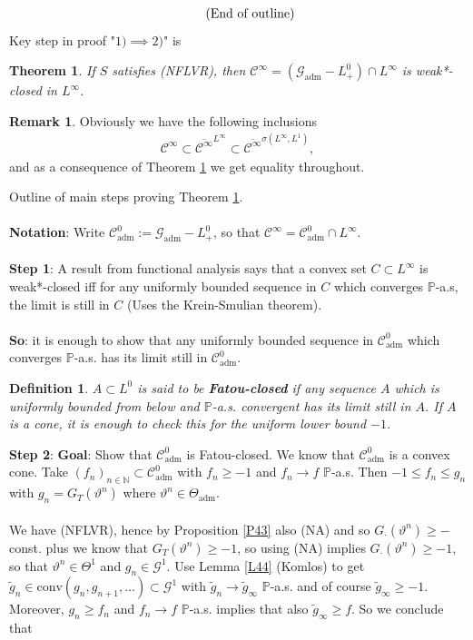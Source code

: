 \documentclass[12pt,a4paper, twoside]{article}
\newtheorem{thm}{Theorem}[section]
\newtheorem{defn}{Definition}[section]
\theoremstyle{definition}
\newtheorem{rem}{Remark}[section]
\newcommand{\PP}{\mathbb{P}} %
\begin{document}
\begin{align*}
\tag{\text{End of outline}}
\end{align*}
\newpage
Key step in proof "$1)\implies 2)$" is
\begin{thm} \label{T46} If $S$ satisfies (NFLVR), then $\mathcal{C}^\infty = ( \mathcal{G}_\text{adm}-L_+^0) \cap L^\infty$ is weak*-closed in $L^\infty$. 
\end{thm}
\begin{rem}Obviously we have the following inclusions 
\begin{align*}
\mathcal{C}^\infty \subset \overline{\mathcal{C}^\infty}^{L^\infty} \subset \overline{\mathcal{C}^\infty}^{ \sigma( L^\infty, L^1)},
\end{align*}
and as a consequence of Theorem \ref{T46} we get equality throughout. 
\end{rem}
Outline of main steps proving Theorem \ref{T46}.
\\\\
\textbf{Notation}: Write $\mathcal{C}_\text{adm}^0 := \mathcal{G}_\text{adm}-L_+^0$, so that $\mathcal{C}^\infty = \mathcal{C}_\text{adm}^0 \cap L^\infty$. \\
\\
\textbf{Step 1}: A result from functional analysis says that a convex set $C \subset L^\infty$ is weak*-closed iff for any uniformly bounded sequence in $C$ which converges $\PP$-a.s, the limit is still in $C$ (Uses the Krein-Smulian theorem).
\\\\
\textbf{So}: it is enough to show that any uniformly bounded sequence in $\mathcal{C}_\text{adm}^0$ which converges $\PP$-a.s. has its limit still in $\mathcal{C}_\text{adm}^0.$
\begin{defn} $A \subset L^0$ is said to be \textbf{Fatou-closed} if any sequence $A$ which is uniformly bounded from below and $\PP$-a.s. convergent has its limit still in $A$. If $A$ is a cone, it is enough to check this for the uniform lower bound $-1$. 
\end{defn}
\noindent \textbf{Step 2}: \textbf{Goal}: Show that $\mathcal{C}_\text{adm}^0$ is Fatou-closed.  We know that $\mathcal{C}_\text{adm}^0$ is a convex cone. Take $(f_n)_{n \in \mathbb{N}} \subset \mathcal{C}_\text{adm}^0$ with $f_n \geq -1$ and $f_n \to f$ $\PP$-a.s. Then $-1 \leq f_n \leq g_n$ with $g_n = G_T( \vartheta^n)$ where $\vartheta^n \in \Theta_\text{adm}$. \\
\\
We have (NFLVR), hence by Proposition \ref{P43} also (NA) and so $G_\cdot( \vartheta^n) \geq -$const. plus we know that $G_T( \vartheta^n) \geq -1$, so using (NA) implies $G_\cdot ( \vartheta^n) \geq -1$, so that $\vartheta^n \in \Theta^1$ and $g_n \in \mathcal{G}^1$. Use Lemma \ref{L44} (Komlos) to get $\widetilde{g}_n \in \text{conv}(g_n, g_{n+1}, \dots ) \subset \mathcal{G}^1$ with $\widetilde{g}_n \to \widetilde{g}_\infty$ $\PP$-a.s. and of course $\widetilde{g}_\infty \geq -1$. Moreover, $g_n \geq f_n$ and $f_n \to f$ $\PP$-a.s. implies that also $\widetilde{g}_\infty \geq f$. So we conclude that
\end{document}
